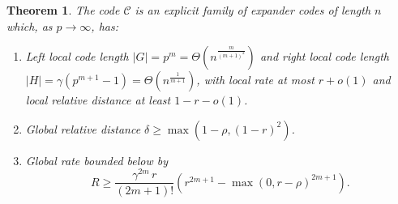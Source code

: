 \documentclass[11pt]{article}
\theoremstyle{plain}
\newtheorem{theorem}{Theorem}[section]
\theoremstyle{definition}
\begin{document}
\begin{theorem}
\label{thm:params-second}
The code $\mathcal{C}$ is an explicit family of expander codes of length $n$ which, as $p \to \infty$, has:
\begin{enumerate}
    \item Left local code length $|G|=p^m = \Theta(n^{\frac{m}{(m+1)^2}})$ and right local code length $|H|=\gamma (p^{m+1}-1) = \Theta(n^{\frac{1}{m+1}})$, with local rate at most $r+o(1)$ and local relative distance at least $1-r-o(1)$.
    \item Global relative distance $\delta \ge \max(1-\rho, (1-r)^2)$.
    \item Global rate bounded below by \[ R \ge \frac{\gamma^{2m}\, r}{(2m+1)!}\left(r^{2m+1}-\max(0,r-\rho)^{2m+1}\right). \]
\end{enumerate}
\end{theorem}
\end{document}

